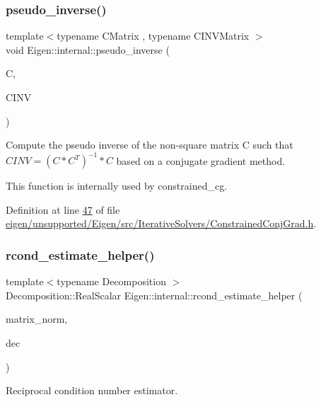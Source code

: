 \subsubsection{\texorpdfstring{pseudo\+\_\+inverse()}{pseudo\_inverse()}}
{\footnotesize\ttfamily template$<$typename C\+Matrix , typename C\+I\+N\+V\+Matrix $>$ \\
void Eigen\+::internal\+::pseudo\+\_\+inverse (\begin{DoxyParamCaption}\item[{const C\+Matrix \&}]{C,  }\item[{C\+I\+N\+V\+Matrix \&}]{C\+I\+NV }\end{DoxyParamCaption})}

Compute the pseudo inverse of the non-\/square matrix C such that $ CINV = (C * C^T)^{-1} * C $ based on a conjugate gradient method.

This function is internally used by constrained\+\_\+cg. 

Definition at line \hyperlink{eigen_2unsupported_2_eigen_2src_2_iterative_solvers_2_constrained_conj_grad_8h_source_l00047}{47} of file \hyperlink{eigen_2unsupported_2_eigen_2src_2_iterative_solvers_2_constrained_conj_grad_8h_source}{eigen/unsupported/\+Eigen/src/\+Iterative\+Solvers/\+Constrained\+Conj\+Grad.\+h}.

\mbox{\label{namespace_eigen_1_1internal_ad1de0d785387bfb5435c410bf0554068}} 
\subsubsection{\texorpdfstring{rcond\+\_\+estimate\+\_\+helper()}{rcond\_estimate\_helper()}}
{\footnotesize\ttfamily template$<$typename Decomposition $>$ \\
Decomposition\+::\+Real\+Scalar Eigen\+::internal\+::rcond\+\_\+estimate\+\_\+helper (\begin{DoxyParamCaption}\item[{typename Decomposition\+::\+Real\+Scalar}]{matrix\+\_\+norm,  }\item[{const Decomposition \&}]{dec }\end{DoxyParamCaption})}



Reciprocal condition number estimator. 

